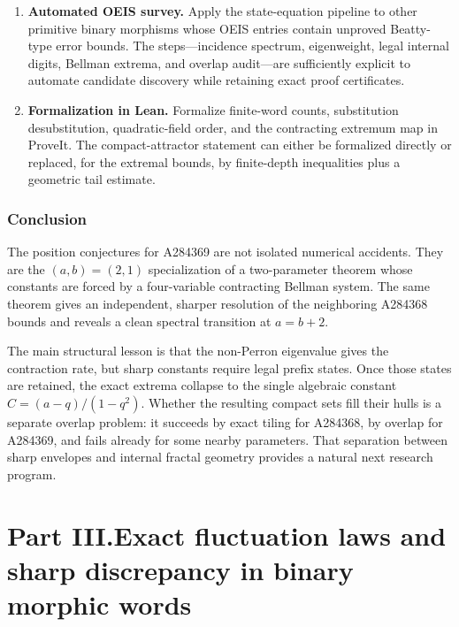 \documentclass[11pt]{article}
\numberwithin{equation}{section}
\theoremstyle{definition}
\theoremstyle{remark}
\begin{document}
\begin{enumerate}[leftmargin=*,itemsep=5pt]
\item \textbf{Automated OEIS survey.}
Apply the state-equation pipeline to other primitive binary morphisms whose
OEIS entries contain unproved Beatty-type error bounds.  The steps---incidence
spectrum, eigenweight, legal internal digits, Bellman extrema, and overlap
audit---are sufficiently explicit to automate candidate discovery while
retaining exact proof certificates.

\item \textbf{Formalization in Lean.}
Formalize finite-word counts, substitution desubstitution, quadratic-field
order, and the contracting extremum map in ProveIt.  The compact-attractor
statement can either be formalized directly or replaced, for the extremal
bounds, by finite-depth inequalities plus a geometric tail estimate.
\end{enumerate}

\section{Conclusion}

The position conjectures for A284369 are not isolated numerical accidents.
They are the $(a,b)=(2,1)$ specialization of a two-parameter theorem whose
constants are forced by a four-variable contracting Bellman system.  The same
theorem gives an independent, sharper resolution of the neighboring A284368
bounds and reveals a clean spectral transition at $a=b+2$.

The main structural lesson is that the non-Perron eigenvalue gives the
contraction rate, but sharp constants require legal prefix states.  Once those
states are retained, the exact extrema collapse to the single algebraic
constant ${\widehat C}=(a-q)/(1-q^2)$.  Whether the resulting compact sets fill their
hulls is a separate overlap problem: it succeeds by exact tiling for A284368,
by overlap for A284369, and fails already for some nearby parameters.  That
separation between sharp envelopes and internal fractal geometry provides a
natural next research program.


\clearpage
{}\part*{Part III.\quad Exact fluctuation laws and sharp discrepancy in binary morphic words}
\setcounter{table}{0}
\renewcommand{\thetable}{III.\arabic{table}}
\renewcommand{\theHtable}{III.\arabic{table}}
\end{document}
